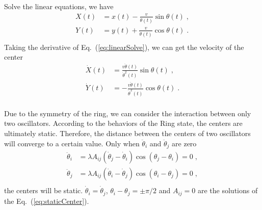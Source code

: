 \documentclass[%
 aip,
 amsmath,amssymb,
 reprint,%
]{revtex4-1}
\begin{document}
Solve the linear equations, we have
\begin{equation}\label{eq:linearSolve}
    \begin{aligned}
        X\left( t \right) &=x\left( t \right) -\frac{v}{\dot{\theta}\left( t \right)}\sin \theta \left( t \right)\;,\\
        Y\left( t \right) &=y\left( t \right) +\frac{v}{\dot{\theta}\left( t \right)}\cos \theta \left( t \right)\;.\\
    \end{aligned}
\end{equation}
Taking the derivative of Eq.~(\ref{eq:linearSolve}), we can get the velocity of the center
\begin{equation}
    \begin{aligned}
        \dot{X}\left( t \right) &=\frac{v\ddot{\theta}\left( t \right)}{\dot{\theta}^2\left( t \right)}\sin \theta \left( t \right)\;,\\
        \dot{Y}\left( t \right) &=-\frac{v\ddot{\theta}\left( t \right)}{\dot{\theta}^2\left( t \right)}\cos \theta \left( t \right)\;.\\
    \end{aligned}
\end{equation}

Due to the symmetry of the ring, we can consider the interaction between only two oscillators. 
According to the behaviors of the Ring state, the centers are ultimately static. Therefore, the distance between the centers of two oscillators will converge to a certain value. Only when $\ddot{\theta}_i$ and $\ddot{\theta}_j$ are zero
\begin{equation}\label{eq:staticCenter}
    \begin{aligned}
        \ddot{\theta}_i&=\lambda A_{ij}\left( \dot{\theta}_j-\dot{\theta}_i \right) \cos \left( \theta _j-\theta _i \right) =0\;,\\
        \ddot{\theta}_j&=\lambda A_{ij}\left( \dot{\theta}_i-\dot{\theta}_j \right) \cos \left( \theta _i-\theta _j \right) =0\;,\\
    \end{aligned}
\end{equation}
the centers will be static. $\dot{\theta}_i=\dot{\theta}_j$, $\theta _i-\theta _j=\pm\pi/2$ and $A_{ij}=0$ are the solutions of the Eq.~(\ref{eq:staticCenter}).
\end{document}
